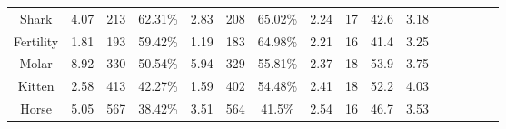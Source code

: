 \begin{table}
{{\begin{tabular}{c|ccc|ccc|cc|c|clllll}
            Shark                  & \multicolumn{1}{c}{4.07}                  & \multicolumn{1}{c}{213}                     & 62.31\%                           & \multicolumn{1}{c}{2.83}         & \multicolumn{1}{c}{208}            & 65.02\%              & \multicolumn{1}{c}{2.24}      & 17                                    & 42.6                                  & 3.18 &                      &  &  &                      &                      \\
            Fertility              & \multicolumn{1}{c}{1.81}                  & \multicolumn{1}{c}{193}                     & 59.42\%                           & \multicolumn{1}{c}{1.19}         & \multicolumn{1}{c}{183}            & 64.98\%              & \multicolumn{1}{c}{2.21}      & 16                                    & 41.4                                  & 3.25 &                      &  &  &                      &                      \\
            Molar                  & \multicolumn{1}{c}{8.92}                  & \multicolumn{1}{c}{330}                     & 50.54\%                           & \multicolumn{1}{c}{5.94}         & \multicolumn{1}{c}{329}            & 55.81\%              & \multicolumn{1}{c}{2.37}      & 18                                    & 53.9                                  & 3.75 &                      &  &  &                      &                      \\
            Kitten                 & \multicolumn{1}{c}{2.58}                  & \multicolumn{1}{c}{413}                     & 42.27\%                           & \multicolumn{1}{c}{1.59}         & \multicolumn{1}{c}{402}            & 54.48\%              & \multicolumn{1}{c}{2.41}      & 18                                    & 52.2                                  & 4.03 &                      &  &  &                      &                      \\

            Horse                  & \multicolumn{1}{c}{5.05}                  & \multicolumn{1}{c}{567}                     & 38.42\%                           & \multicolumn{1}{c}{3.51}         & \multicolumn{1}{c}{564}            & 41.5\%               & \multicolumn{1}{c}{2.54}      & 16                                    & 46.7                                  & 3.53 &                      &  &  &                      &                      \\ \cline{1-11}
        \end{tabular}}}
\end{table}



